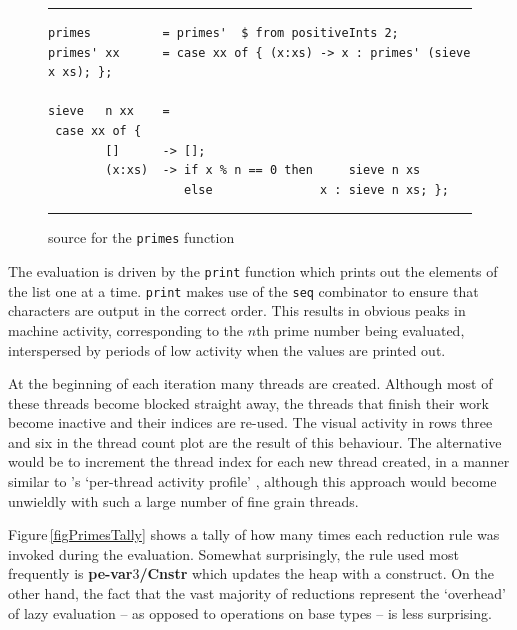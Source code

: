 \documentclass{llncs}
\begin{document}
\begin{figure}
\hrule
\medskip
\begin{verbatim}
primes          = primes'  $ from positiveInts 2;
primes' xx      = case xx of { (x:xs) -> x : primes' (sieve x xs); };

sieve   n xx    =
 case xx of {
        []      -> [];
        (x:xs)  -> if x % n == 0 then     sieve n xs
                   else               x : sieve n xs; };
\end{verbatim}
\hrule
\caption{\ample source for the \texttt{primes} function}
\label{figPrimesSource}
\end{figure}


The evaluation is driven by the \texttt{print} function which prints out the elements of the list one at a time. \texttt{print} makes use of the \texttt{seq} combinator to ensure that characters are output in the correct order. This results in obvious peaks in machine activity, corresponding to the $n$th prime number being evaluated, interspersed by periods of low activity when the values are printed out.

At the beginning of each iteration many threads are created. Although most of these threads become blocked straight away, the threads that finish their work become inactive and their indices are re-used. The visual activity in rows three and six in the thread count plot are the result of this behaviour. The alternative would be to increment the thread index for each new thread created, in a manner similar to \gransim's `per-thread activity profile' \cite{king:stratprof}, although this approach would become unwieldly with such a large number of fine grain threads. 


Figure\,\ref{figPrimesTally} shows a tally of how many times each reduction rule was invoked during the evaluation. Somewhat surprisingly, the rule used most frequently is \textbf{pe-var$3$/Cnstr} which updates the heap with a construct. On the other hand, the fact that the vast majority of reductions represent the `overhead' of lazy evaluation -- as opposed to operations on base types -- is less surprising.
\end{document}
